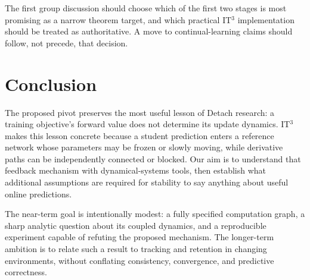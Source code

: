 \documentclass[11pt,a4paper]{article}
\begin{document}
The first group discussion should choose which of the first two stages is most promising as a narrow theorem target, and which practical IT$^3$ implementation should be treated as authoritative. A move to continual-learning claims should follow, not precede, that decision.

\section{Conclusion}
The proposed pivot preserves the most useful lesson of Detach research: a training objective's forward value does not determine its update dynamics. IT$^3$ makes this lesson concrete because a student prediction enters a reference network whose parameters may be frozen or slowly moving, while derivative paths can be independently connected or blocked. Our aim is to understand that feedback mechanism with dynamical-systems tools, then establish what additional assumptions are required for stability to say anything about useful online predictions.

The near-term goal is intentionally modest: a fully specified computation graph, a sharp analytic question about its coupled dynamics, and a reproducible experiment capable of refuting the proposed mechanism. The longer-term ambition is to relate such a result to tracking and retention in changing environments, without conflating consistency, convergence, and predictive correctness.

\vspace{0.6em}
\end{document}
